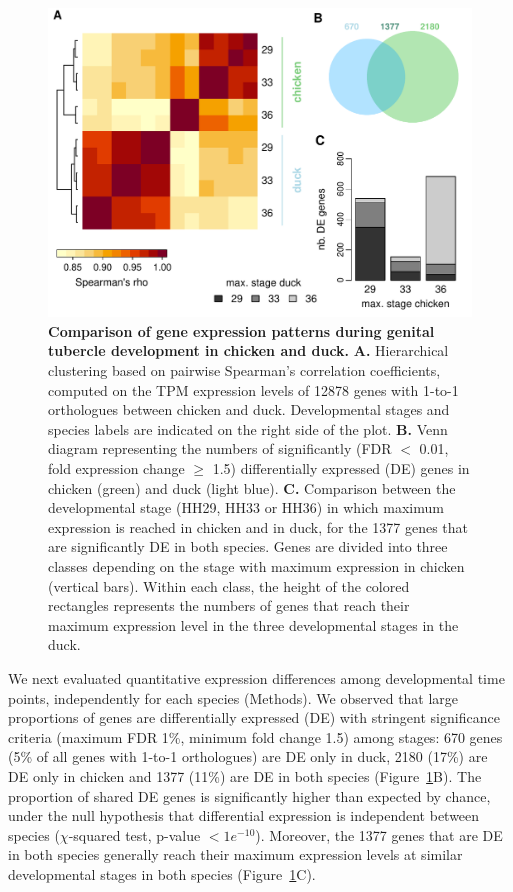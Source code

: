 \begin{figure}[hbt!]
 \centering
 \includegraphics[width=1\textwidth, page=1] {figures/IPLOSS/IPLOSS_Figure1.pdf}
 \caption[Comparison of gene expression patterns during genital tubercle development in chicken and duck.]{
 \textbf{Comparison of gene expression patterns during genital tubercle development in chicken and duck.}
 \textbf{A.} Hierarchical clustering based on pairwise Spearman's correlation coefficients, computed on the TPM expression levels of 12878 genes with 1-to-1 orthologues between chicken and duck. Developmental stages and species labels are indicated on the right side of the plot.
 \textbf{B.} Venn diagram representing the numbers of significantly (FDR $<$ 0.01, fold expression change $\geq$ 1.5) differentially expressed (DE) genes in chicken (green) and duck (light blue).
 \textbf{C.} Comparison between the developmental stage (HH29, HH33 or HH36) in which maximum expression is reached in chicken and in duck, for the 1377 genes that are significantly DE in both species. Genes are divided into three classes depending on the stage with maximum expression in chicken (vertical bars). Within each class, the height of the colored rectangles represents the numbers of genes that reach their maximum expression level in the three developmental stages in the duck. 
 \\
 }
 \label{fig:IPLOSS-fig1}
\end{figure} 

We next evaluated quantitative expression differences among developmental time points, independently for each species (Methods). We observed that large proportions of genes are differentially expressed (DE) with stringent significance criteria (maximum FDR 1\%, minimum fold change 1.5) among stages: 670 genes (5\% of all genes with 1-to-1 orthologues) are DE only in duck, 2180 (17\%) are DE only in chicken and 1377 (11\%) are DE in both species (Figure~\ref{fig:IPLOSS-fig1}B). The proportion of shared DE genes is significantly higher than expected by chance, under the null hypothesis that differential expression is independent between species ($\chi$-squared test, p-value $<1e^{-10}$). Moreover, the 1377 genes that are DE in both species generally reach their maximum expression levels at similar developmental stages in both species (Figure~\ref{fig:IPLOSS-fig1}C).

